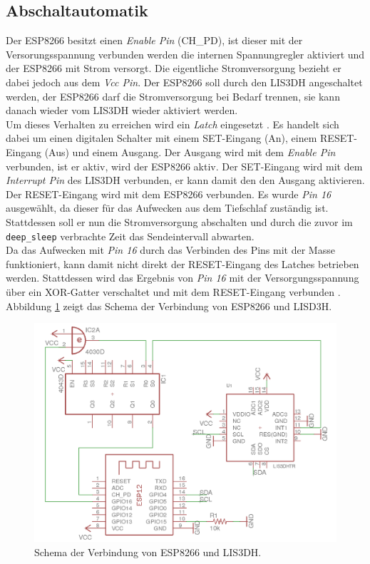 \subsection{Abschaltautomatik}
\label{ch:Beschleunigungssensor:sec:Abschaltautomatik}
Der ESP8266 besitzt einen \emph{Enable Pin} (CH\_PD), ist dieser mit der Versorungsspannung verbunden werden die internen Spannungregler aktiviert und der ESP8266 mit Strom versorgt.
Die eigentliche Stromversorgung bezieht er dabei jedoch aus dem \emph{Vcc Pin}.
Der ESP8266 soll durch den LIS3DH angeschaltet werden, der ESP8266 darf die Stromversorgung bei Bedarf trennen, sie kann danach wieder vom LIS3DH wieder aktiviert werden. \\
Um dieses Verhalten zu erreichen wird ein \emph{Latch} eingesetzt \cite{texas2003latch}.
Es handelt sich dabei um einen digitalen Schalter mit einem SET-Eingang (An), einem RESET-Eingang (Aus) und einem Ausgang.
Der Ausgang wird mit dem \emph{Enable Pin} verbunden, ist er aktiv, wird der ESP8266 aktiv.
Der SET-Eingang wird mit dem \emph{Interrupt Pin} des LIS3DH verbunden, er kann damit den den Ausgang aktivieren.
Der RESET-Eingang wird mit dem ESP8266 verbunden. 
Es wurde \emph{Pin 16} ausgewählt, da dieser für das Aufwecken aus dem Tiefschlaf zuständig ist. 
Stattdessen soll er nun die Stromversorgung abschalten und durch die zuvor im \texttt{deep\_sleep} verbrachte Zeit das Sendeintervall abwarten.\\
Da das Aufwecken mit \emph{Pin 16} durch das Verbinden des Pins mit der Masse funktioniert, kann damit nicht direkt der RESET-Eingang des Latches betrieben werden.
Stattdessen wird das Ergebnis von \emph{Pin 16} mit der Versorgungsspannung über ein XOR-Gatter verschaltet und mit dem RESET-Eingang verbunden \cite{texas2014xor}.
Abbildung \ref{fig:schematics} zeigt das Schema der Verbindung von ESP8266 und LISD3H.

\begin{figure}[h]
  \centering
	\includegraphics[width=\textwidth]{images/schematics.png}
  \caption{Schema der Verbindung von ESP8266 und LIS3DH.}
  \label{fig:schematics}
\end{figure}

